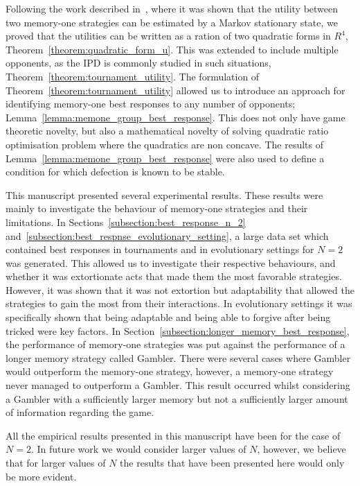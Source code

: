 Following the work described in~\cite{Nowak1989}, where it was shown that the
utility between two memory-one strategies can be estimated by a Markov
stationary state, we proved that the utilities can be written as a ration of two
quadratic forms in $R^4$, Theorem~\ref{theorem:quadratic_form_u}. This was
extended to include multiple opponents, as the IPD is commonly studied in such
situations, Theorem~\ref{theorem:tournament_utility}.
The formulation of Theorem~\ref{theorem:tournament_utility} allowed us to introduce an approach for identifying
memory-one best responses to any number of opponents;
Lemma~\ref{lemma:memone_group_best_response}. This does not only have game
theoretic novelty, but also a mathematical novelty of solving quadratic ratio
optimisation problem where the quadratics are non concave. The results of
Lemma~\ref{lemma:memone_group_best_response} were also used to define a
condition for which defection is known to be stable.

This manuscript presented several experimental results. These results were mainly to
investigate the behaviour of memory-one strategies and their limitations. In
Sections~\ref{subsection:best_response_n_2}
and~\ref{subsection:best_respnse_evolutionary_setting}, a large data set which
contained best responses in tournaments and in evolutionary settings for $N=2$
was generated. This allowed us to investigate their respective behaviours, and
whether it was extortionate acts that made them the most favorable strategies.
However, it was shown that it was not extortion but adaptability that allowed
the strategies to gain the most from their interactions.
In evolutionary settings it was specifically shown that being adaptable and being
able to forgive after being tricked were key factors. In Section~\ref{subsection:longer_memory_best_response}, the performance of
memory-one strategies was put against the performance of a longer memory
strategy called Gambler. There were several cases where Gambler would outperform
the memory-one strategy, however, a memory-one strategy never managed to outperform
a Gambler. This result occurred whilst considering a Gambler with a sufficiently
larger memory but not a sufficiently larger amount of information regarding
the game.

All the empirical results presented in this manuscript have been for the
case of $N=2$. In future work we would consider larger values of $N$, however, we
believe that for larger values of $N$ the results that have been presented here would
only be more evident.

